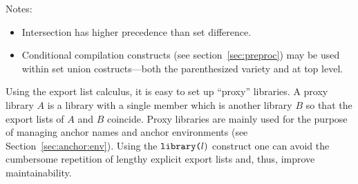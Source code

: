 \noindent Notes:
\begin{itemize}\setlength{\itemsep}{0pt}
\item Intersection has higher precedence than set difference.
\item Conditional compilation constructs (see
section~\ref{sec:preproc}) may be used within set union
costructs---both the parenthesized variety and at top level.
\end{itemize}

Using the export list calculus, it is easy to set up ``proxy''
libraries.  A proxy library $A$ is a library with a single member
which is another library $B$ so that the export lists of $A$ and $B$
coincide.  Proxy libraries are mainly used for the purpose of managing
anchor names and anchor environments (see
Section~\ref{sec:anchor:env}).  Using the $\mbox{\tt
library(}l\mbox{)}$ construct one can avoid the cumbersome repetition
of lengthy explicit export lists and, thus, improve maintainability.
